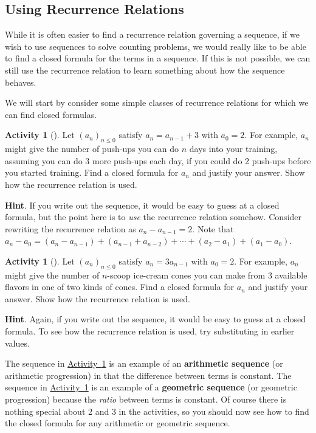 \documentclass[10pt,]{book}
\newcommand{\terminology}[1]{\textbf{#1}}
\theoremstyle{plain}
\theoremstyle{definition}
\theoremstyle{definition}
\theoremstyle{definition}
\newtheorem{activity}[project]{Activity}
\numberwithin{equation}{chapter}
\begin{document}
\subsection[{Using Recurrence Relations}]{Using Recurrence Relations}\label{subsec-recursionclosed}
\hypertarget{p-922}{}%
While it is often easier to find a recurrence relation governing a sequence, if we wish to use sequences to solve counting problems, we would really like to be able to find a closed formula for the terms in a sequence. If this is not possible, we can still use the recurrence relation to learn something about how the sequence behaves.%
\par
\hypertarget{p-923}{}%
We will start by consider some simple classes of recurrence relations for which we can find closed formulas.%
\begin{activity}[]\label{act-arithmetic}
\hypertarget{p-924}{}%
Let \((a_n)_{n \le 0}\) satisfy \(a_n = a_{n-1} + 3\) with \(a_0 = 2\).  For example, \(a_n\) might give the number of push-ups you can do \(n\) days into your training, assuming you can do 3 more push-ups each day, if you could do 2 push-ups before you started training.  Find a closed formula for \(a_n\) and justify your answer.  Show how the recurrence relation is used.%
\par\smallskip%
\noindent\textbf{Hint}.\hypertarget{hint-102}{}\quad%
\hypertarget{p-925}{}%
If you write out the sequence, it would be easy to guess at a closed formula, but the point here is to \emph{use} the recurrence relation somehow.  Consider rewriting the recurrence relation as \(a_n - a_{n-1} = 2\).  Note that \(a_n - a_0 = (a_n - a_{n-1}) + (a_{n-1} + a_{n-2}) + \cdots + (a_2 - a_1) + (a_1 - a_0)\).%
\end{activity}
\begin{activity}[]\label{act-geometric}
\hypertarget{p-926}{}%
Let \((a_n)_{n \le 0}\) satisfy \(a_n = 3a_{n-1}\) with \(a_0 = 2\).  For example, \(a_n\) might give the number of \(n\)-scoop ice-cream cones you can make from 3 available flavors in one of two kinds of cones.  Find a closed formula for \(a_n\) and justify your answer.  Show how the recurrence relation is used.%
\par\smallskip%
\noindent\textbf{Hint}.\hypertarget{hint-103}{}\quad%
\hypertarget{p-927}{}%
Again, if you write out the sequence, it would be easy to guess at a closed formula.  To see how the recurrence relation is used, try substituting in earlier values.%
\end{activity}
\hypertarget{p-928}{}%
The sequence in \hyperref[act-arithmetic]{Activity~\ref{act-arithmetic}} is an example of an \terminology{arithmetic sequence} (or arithmetic progression) in that the difference between terms is constant.  The sequence in \hyperref[act-geometric]{Activity~\ref{act-geometric}} is an example of a \terminology{geometric sequence} (or geometric progression) because the \emph{ratio} between terms is constant.  Of course there is nothing special about 2 and 3 in the activities, so you should now see how to find the closed formula for any arithmetic or geometric sequence.%
\end{document}

